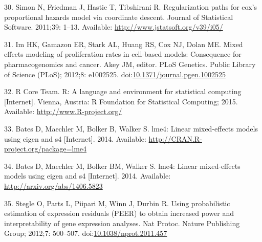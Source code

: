 \documentclass[]{article}
\begin{document}
30. Simon N, Friedman J, Hastie T, Tibshirani R. Regularization paths
for cox's proportional hazards model via coordinate descent. Journal of
Statistical Software. 2011;39: 1--13. Available:
\url{http://www.jstatsoft.org/v39/i05/}

31. Im HK, Gamazon ER, Stark AL, Huang RS, Cox NJ, Dolan ME. Mixed
effects modeling of proliferation rates in cell-based models:
Consequence for pharmacogenomics and cancer. Akey JM, editor. PLoS
Genetics. Public Library of Science (PLoS); 2012;8: e1002525.
doi:\href{http://dx.doi.org/10.1371/journal.pgen.1002525}{10.1371/journal.pgen.1002525}

32. R Core Team. R: A language and environment for statistical computing
{[}Internet{]}. Vienna, Austria: R Foundation for Statistical Computing;
2015. Available: \url{http://www.R-project.org/}

33. Bates D, Maechler M, Bolker B, Walker S. lme4: Linear mixed-effects
models using eigen and s4 {[}Internet{]}. 2014. Available:
\url{http://CRAN.R-project.org/package=lme4}

34. Bates D, Maechler M, Bolker BM, Walker S. lme4: Linear mixed-effects
models using eigen and s4 {[}Internet{]}. 2014. Available:
\url{http://arxiv.org/abs/1406.5823}

35. Stegle O, Parts L, Piipari M, Winn J, Durbin R. Using probabilistic
estimation of expression residuals (PEER) to obtain increased power and
interpretability of gene expression analyses. Nat Protoc. Nature
Publishing Group; 2012;7: 500--507.
doi:\href{http://dx.doi.org/10.1038/nprot.2011.457}{10.1038/nprot.2011.457}
\end{document}
